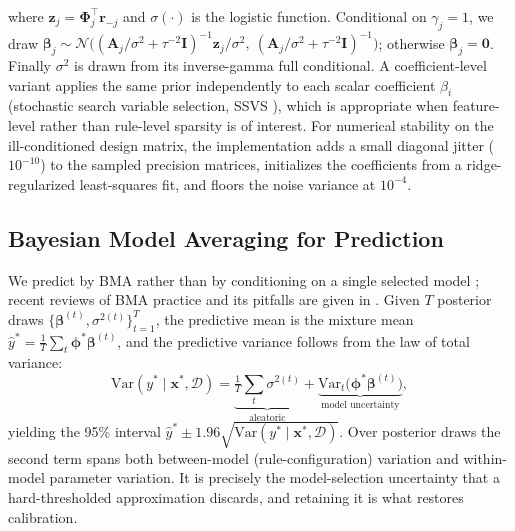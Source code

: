 \documentclass[review,1p,times]{elsarticle}
\begin{document}
where $\mathbf{z}_j=\boldsymbol{\Phi}_j^{\top}\mathbf{r}_{-j}$ and $\sigma(\cdot)$ is the logistic function. Conditional on $\gamma_j=1$, we draw $\boldsymbol{\beta}_j\sim\mathcal{N}\big((\mathbf{A}_j/\sigma^2+\tau^{-2}\mathbf{I})^{-1}\mathbf{z}_j/\sigma^2,\ (\mathbf{A}_j/\sigma^2+\tau^{-2}\mathbf{I})^{-1}\big)$; otherwise $\boldsymbol{\beta}_j=\mathbf{0}$. Finally $\sigma^2$ is drawn from its inverse-gamma full conditional. A coefficient-level variant applies the same prior independently to each scalar coefficient $\beta_i$ (stochastic search variable selection, SSVS \cite{george1993variable}), which is appropriate when feature-level rather than rule-level sparsity is of interest. For numerical stability on the ill-conditioned design matrix, the implementation adds a small diagonal jitter ($10^{-10}$) to the sampled precision matrices, initializes the coefficients from a ridge-regularized least-squares fit, and floors the noise variance at $10^{-4}$.

\subsection{Bayesian Model Averaging for Prediction}
\label{sec:bma}

We predict by BMA rather than by conditioning on a single selected model \cite{hoeting1999bayesian}; recent reviews of BMA practice and its pitfalls are given in \cite{fragoso2018bayesian}. Given $T$ posterior draws $\{\boldsymbol{\beta}^{(t)},\sigma^{2(t)}\}_{t=1}^{T}$, the predictive mean is the mixture mean $\hat{y}^*=\frac1T\sum_t \boldsymbol{\phi}^*\boldsymbol{\beta}^{(t)}$, and the predictive variance follows from the law of total variance:
\begin{equation}
 \mathrm{Var}(y^*\mid\mathbf{x}^*,\mathcal{D})
 = \underbrace{\tfrac1T\sum_t \sigma^{2(t)}}_{\text{aleatoric}}
 + \underbrace{\mathrm{Var}_t\big(\boldsymbol{\phi}^*\boldsymbol{\beta}^{(t)}\big)}_{\text{model uncertainty}},
 \label{eq:bma}
\end{equation}
yielding the 95\% interval $\hat{y}^*\pm1.96\sqrt{\mathrm{Var}(y^*\mid\mathbf{x}^*,\mathcal{D})}$.
Over posterior draws the second term spans both between-model (rule-configuration) variation and within-model parameter variation.
It is precisely the model-selection uncertainty that a hard-thresholded approximation discards, and retaining it is what restores calibration.
\end{document}
